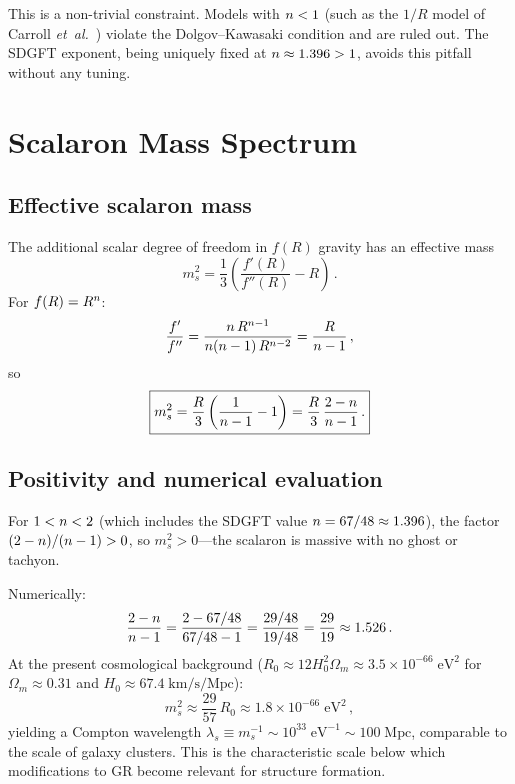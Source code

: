 \documentclass[amsmath,amssymb,aps,prd,twocolumn,superscriptaddress,nofootinbib]{revtex4-2}
\begin{document}
This is a non-trivial constraint.  Models with $n < 1$ (such as
the $1/R$ model of Carroll {\it et~al.}~\cite{Carroll2004})
violate the Dolgov--Kawasaki condition and are ruled out.  The SDGFT
exponent, being uniquely fixed at $n \approx 1.396 > 1$, avoids
this pitfall without any tuning.

\section{Scalaron Mass Spectrum}
\label{sec:scalaron}

\subsection{Effective scalaron mass}

The additional scalar degree of freedom in $f(R)$ gravity has
an effective mass~\cite{Starobinsky2007,Hu2007}
\begin{equation}
  m_s^2 = \frac{1}{3}\left(\frac{f'(R)}{f''(R)} - R\right)\,.
  \label{eq:ms_general}
\end{equation}
For $f(R) = R^{n}$:
\begin{equation}
  \frac{f'}{f''} = \frac{n\,R^{n-1}}{n(n-1)\,R^{n-2}}
                 = \frac{R}{n - 1}\,,
  \label{eq:ratio}
\end{equation}
so
\begin{equation}
  \boxed{%
    m_s^2 = \frac{R}{3}\left(\frac{1}{\nfR - 1} - 1\right)
          = \frac{R}{3}\,\frac{2 - \nfR}{\nfR - 1}\,.
  }
  \label{eq:ms_Rn}
\end{equation}

\subsection{Positivity and numerical evaluation}

For $1 < n < 2$ (which includes the SDGFT value
$n = 67/48 \approx 1.396$), the factor $(2-n)/(n-1) > 0$,
so $m_s^2 > 0$---the scalaron is massive with no ghost or tachyon.

Numerically:
\begin{equation}
  \frac{2 - n}{n - 1}
    = \frac{2 - 67/48}{67/48 - 1}
    = \frac{29/48}{19/48}
    = \frac{29}{19}
    \approx 1.526\,.
  \label{eq:ms_coeff}
\end{equation}
At the present cosmological background ($R_0 \approx
12 H_0^2 \Omega_m \approx 3.5 \times 10^{-66}\;\mathrm{eV}^2$ for
$\Omega_m \approx 0.31$ and $H_0 \approx 67.4\;\mathrm{km/s/Mpc}$):
\begin{equation}
  m_s^2 \approx \frac{29}{57}\,R_0
       \approx 1.8 \times 10^{-66}\;\mathrm{eV}^2\,,
  \label{eq:ms_today}
\end{equation}
yielding a Compton wavelength $\lambda_s \equiv m_s^{-1} \sim
10^{33}\;\mathrm{eV}^{-1} \sim 100\;\mathrm{Mpc}$, comparable
to the scale of galaxy clusters.  This is the characteristic
scale below which modifications to GR become relevant for
structure formation.
\end{document}
